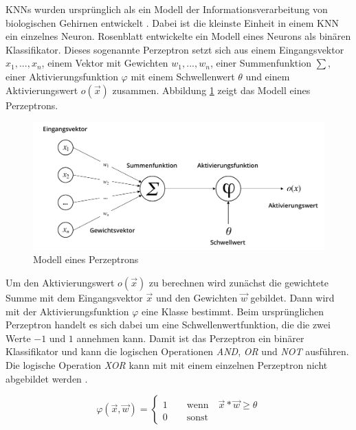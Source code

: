 \acp{KNN} wurden ursprünglich als ein Modell der Informationsverarbeitung von biologischen Gehirnen entwickelt \cite{mcculloch1943logical}. Dabei ist die kleinste Einheit in einem \ac{KNN} ein einzelnes Neuron. Rosenblatt \cite{rosenblatt1958perceptron} entwickelte ein Modell eines Neurons als binären Klassifikator. Dieses sogenannte Perzeptron setzt sich aus einem Eingangsvektor $x_1, ..., x_n$, einem Vektor mit Gewichten $w_1, ..., w_n$, einer Summenfunktion $\sum$, einer Aktivierungsfunktion $\varphi$ mit einem Schwellenwert $\theta$ und einem Aktivierungswert $o(\vec{x})$ zusammen. Abbildung \ref{fig_perceptron} zeigt das Modell eines Perzeptrons.

\begin{figure}[h]
\centering
\includegraphics[scale=0.7]{images/perceptron.pdf}
\caption{Modell eines Perzeptrons \cite{rosenblatt1958perceptron}}
\label{fig_perceptron}
\end{figure}

Um den Aktivierungswert $o(\vec{x})$ zu berechnen wird zunächst die gewichtete Summe mit dem Eingangsvektor $\vec{x}$ und den Gewichten $\vec{w}$ gebildet. Dann wird mit der Aktivierungsfunktion $\varphi$ eine Klasse bestimmt. Beim ursprünglichen Perzeptron handelt es sich dabei um eine Schwellenwertfunktion, die die zwei Werte $-1$ und $1$ annehmen kann. Damit ist das Perzeptron ein binärer Klassifikator und kann die logischen Operationen \textit{AND}, \textit{OR} und \textit{NOT} ausführen. Die logische Operation \textit{XOR} kann mit mit einem einzelnen Perzeptron nicht abgebildet werden \cite{minski1969perceptrons}.

\begin{equation}
\varphi(\vec{x}, \vec{w}) = \begin{cases} 1 \qquad \text{wenn} \quad \vec{x}*\vec{w} \geq \theta \\ 0 \qquad \text{sonst} \end{cases}
\end{equation}

